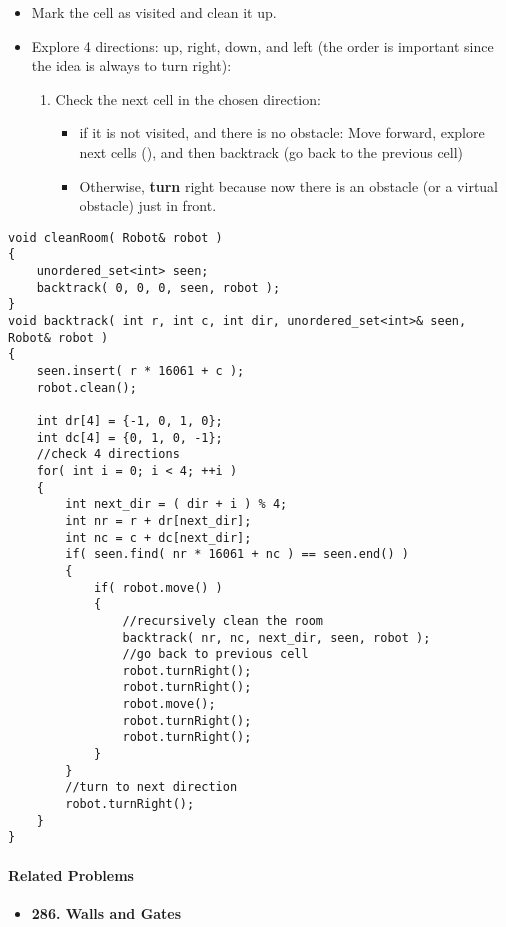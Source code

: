 \begin{itemize}
\item Mark the cell as visited and clean it up.
\item Explore 4 directions: up, right, down, and left (the order is important since the idea is always to turn right):
\begin{enumerate}
\item Check the next cell in the chosen direction: 
\begin{itemize}
\item if it is not visited, and there is no obstacle: Move forward, explore next cells (), and then backtrack (go back to the previous cell)
\item Otherwise, \textbf{turn} right because now there is an obstacle (or a virtual obstacle) just in front.
\end{itemize}
\end{enumerate}
\end{itemize}

\setcounter{lstlisting}{0}
\begin{lstlisting}[style=customc, caption={DFS}]
void cleanRoom( Robot& robot )
{
    unordered_set<int> seen;
    backtrack( 0, 0, 0, seen, robot );
}
void backtrack( int r, int c, int dir, unordered_set<int>& seen, Robot& robot )
{
    seen.insert( r * 16061 + c );
    robot.clean();

    int dr[4] = {-1, 0, 1, 0};
    int dc[4] = {0, 1, 0, -1};
    //check 4 directions
    for( int i = 0; i < 4; ++i )
    {
        int next_dir = ( dir + i ) % 4;
        int nr = r + dr[next_dir];
        int nc = c + dc[next_dir];
        if( seen.find( nr * 16061 + nc ) == seen.end() )
        {
            if( robot.move() )
            {
                //recursively clean the room
                backtrack( nr, nc, next_dir, seen, robot );
                //go back to previous cell
                robot.turnRight();
                robot.turnRight();
                robot.move();
                robot.turnRight();
                robot.turnRight();
            }
        }
        //turn to next direction
        robot.turnRight();
    }
}
\end{lstlisting}

\paragraph{Related Problems}
\begin{itemize}
\item \textbf{286. Walls and Gates}
\end{itemize}